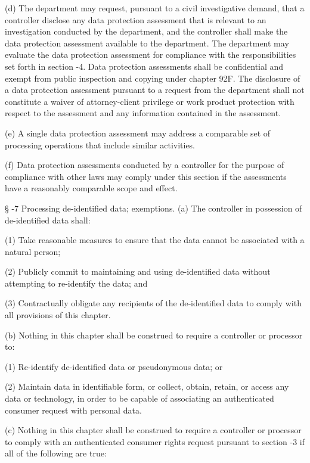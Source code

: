      (d)  The department may request, pursuant to a civil investigative demand, that a controller disclose any data protection assessment that is relevant to an investigation conducted by the department, and the controller shall make the data protection assessment available to the department.  The department may evaluate the data protection assessment for compliance with the responsibilities set forth in section    -4.  Data protection assessments shall be confidential and exempt from public inspection and copying under chapter 92F.  The disclosure of a data protection assessment pursuant to a request from the department shall not constitute a waiver of attorney-client privilege or work product protection with respect to the assessment and any information contained in the assessment.

     (e)  A single data protection assessment may address a comparable set of processing operations that include similar activities.

     (f)  Data protection assessments conducted by a controller for the purpose of compliance with other laws may comply under this section if the assessments have a reasonably comparable scope and effect.

     §   -7  Processing de-identified data; exemptions.  (a)  The controller in possession of de-identified data shall:

     (1)  Take reasonable measures to ensure that the data cannot be associated with a natural person;

     (2)  Publicly commit to maintaining and using de-identified data without attempting to re-identify the data; and

     (3)  Contractually obligate any recipients of the de‑identified data to comply with all provisions of this chapter.

     (b)  Nothing in this chapter shall be construed to require a controller or processor to:

     (1)  Re-identify de-identified data or pseudonymous data; or

     (2)  Maintain data in identifiable form, or collect, obtain, retain, or access any data or technology, in order to be capable of associating an authenticated consumer request with personal data.

     (c)  Nothing in this chapter shall be construed to require a controller or processor to comply with an authenticated consumer rights request pursuant to section    -3 if all of the following are true:

